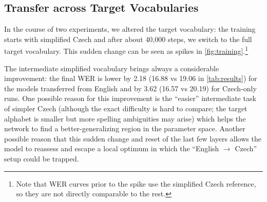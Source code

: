 
\subsection{Transfer across Target Vocabularies}

In the course of two experiments, we altered the target vocabulary: the training starts with simplified Czech and after about 40,000 steps, we switch to the full target vocabulary. This sudden change can be seen as spikes in \cref{fig:training}.\footnote{Note that WER curves prior to the spike use the simplified Czech reference, so they are not directly comparable to the rest.}

The intermediate simplified vocabulary brings always a considerable improvement: the final WER is lower by 2.18 (16.88 vs 19.06 in \cref{tab:results}) for the models transferred from English and by 3.62 (16.57 vs 20.19) for Czech-only runs.
One possible reason for this improvement is the ``easier'' intermediate task of simpler Czech (although the exact difficulty is hard to compare; the target alphabet is smaller but more spelling ambiguities may arise) which helps the network to find a better-generalizing region in the parameter space. Another possible reason that this sudden change and reset of the last few layers allows the model to reassess and escape a local optimum in which the ``English $\rightarrow$ Czech'' setup could be trapped.





